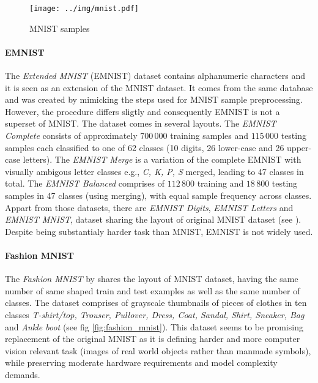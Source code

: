\begin{figure}
    \centering
    \texttt{[image: ../img/mnist.pdf]}
    \caption{MNIST samples}
    \label{fig:mnist}
\end{figure}

\paragraph{EMNIST}

The \emph{Extended MNIST} (EMNIST) dataset contains alphanumeric characters and it is seen as an extension of the MNIST dataset. It comes from the same database and was created by mimicking the steps used for MNIST sample preprocessing. However, the procedure differs sligtly and consequently EMNIST is not a superset of MNIST. The dataset comes in several layouts. The \emph{EMNIST Complete} consists of approximately $700\,000$ training samples and $115\,000$ testing samples each classified to one of 62 classes (10 digits, 26 lower-case and 26 upper-case letters). The \emph{EMNIST Merge} is a variation of the complete EMNIST with visually ambigous letter classes e.g., \emph{C, K, P, S} merged, leading to 47 classes in total. The \emph{EMNIST Balanced} comprises of $112\,800$ training and $18\,800$ testing samples in 47 classes (using merging), with equal sample frequency across classes. Appart from those datasets, there are \emph{EMNIST Digits}, \emph{EMNIST Letters} and \emph{EMNIST MNIST}, dataset sharing the layout of original MNIST dataset (see \cite{DBLP:journals/corr/CohenATS17}). Despite being substantialy harder task than MNIST, EMNIST is not widely used.

\paragraph{Fashion MNIST}

The \emph{Fashion MNIST} by \cite{DBLP:journals/corr/abs-1708-07747} shares the layout of MNIST dataset, having the same number of same shaped train and test examples as well as the same number of classes. The dataset comprises of grayscale thumbnails of pieces of clothes in ten classes \emph{T-shirt/top, Trouser, Pullover, Dress, Coat, Sandal, Shirt, Sneaker, Bag} and \emph{Ankle boot} (see fig \ref{fig:fashion_mnist}). This dataset seems to be promising replacement of the original MNIST as it is defining harder and more computer vision relevant task (images of real world objects rather than manmade symbols), while preserving moderate hardware requirements and model complexity demands.

